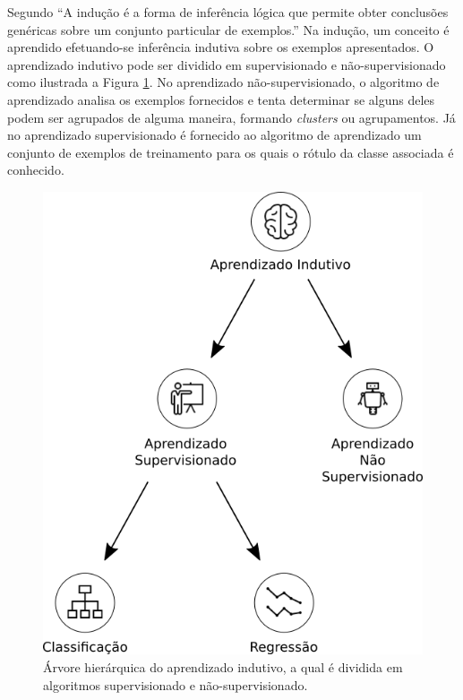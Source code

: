 Segundo \cite{monard_baranauskas:2003} ``A indução é a forma de inferência 
lógica que permite obter conclusões genéricas sobre um conjunto particular de 
exemplos.'' Na indução, um conceito é aprendido efetuando-se inferência 
indutiva sobre os exemplos apresentados. O aprendizado indutivo pode ser 
dividido em supervisionado e não-supervisionado como ilustrada a Figura 
\ref{figure:aprendizado_indutivo}. No aprendizado não-supervisionado, o 
algoritmo de aprendizado analisa os exemplos fornecidos e tenta determinar se 
alguns deles podem ser agrupados de alguma maneira, formando \textit{clusters} 
ou agrupamentos. Já no aprendizado supervisionado é fornecido ao algoritmo de 
aprendizado um conjunto de exemplos de treinamento para os quais o rótulo da 
classe associada é conhecido.

\begin{figure}[H]
\begin{center}
    \includegraphics[scale=0.40]{images/aprendizado_indutivo.png}
\end{center}
\caption{Árvore hierárquica do aprendizado indutivo, a qual é dividida em 
algoritmos supervisionado e não-supervisionado.}
\label{figure:aprendizado_indutivo}
\end{figure}

